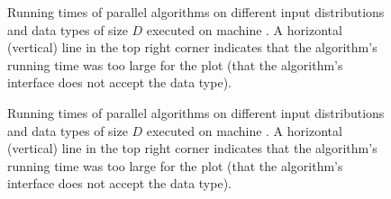 \documentclass{article}
\begin{document}
\begin{figure}[tbp]

  \caption{
    Running times of parallel algorithms on different input distributions and data types of size $D$ executed on machine \pcamd.
    A horizontal (vertical) line in the top right corner indicates that the algorithm's running time was too large for the plot (that the algorithm's interface does not accept the data type).
  }
  \label{fig:par rt distr types 133}
\end{figure}

\begin{figure}[tbp]

  \caption{
    Running times of parallel algorithms on different input distributions and data types of size $D$ executed on machine \pcintellargefour.
    A horizontal (vertical) line in the top right corner indicates that the algorithm's running time was too large for the plot (that the algorithm's interface does not accept the data type).
  }
  \label{fig:par rt distr types 135}
\end{figure}
\end{document}
